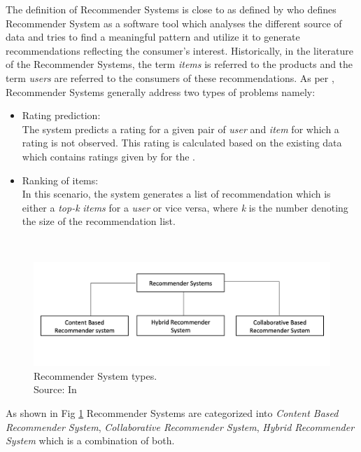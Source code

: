 The definition of Recommender Systems is close to as defined by \textcite[1]{Mertens1997} who defines Recommender System as a software tool which analyses the different source of data and tries to find a meaningful pattern and utilize it to generate recommendations reflecting the consumer's interest. Historically, in the literature of the Recommender Systems, the term \emph{items} is referred to the products and the term \emph{users} are referred to the consumers of these recommendations. As per \textcite[3]{Mertens1997},  Recommender Systems generally address two types of problems namely: \begin{itemize}
    \item Rating prediction: \\
    The system predicts a rating for a given pair of \emph{user} and \emph{item} for which a rating is not observed. This rating is calculated based on the existing data which contains ratings given by  for the .
    \item Ranking of items:\\
    In this scenario, the system generates a list of recommendation which is either a \emph{top-k} \emph{items} for a \emph{user} or vice versa, where \emph{k} is the number denoting the size of the recommendation list.
\end{itemize} \\ \par

\begin{figure}
    \centering
\includegraphics[scale=0.4]{chapters/figures/Recommender System types.png}
    \caption{Recommender System types. \\
    Source: In \textcite[66]{Shoham1997}}
    \label{fig:rec_sys_types}
\end{figure}

As shown in Fig \ref{fig:rec_sys_types} Recommender Systems are categorized into \emph{Content Based Recommender System}, \emph{Collaborative Recommender System}, \emph{ Hybrid Recommender System} which is a combination of both. \\ 

